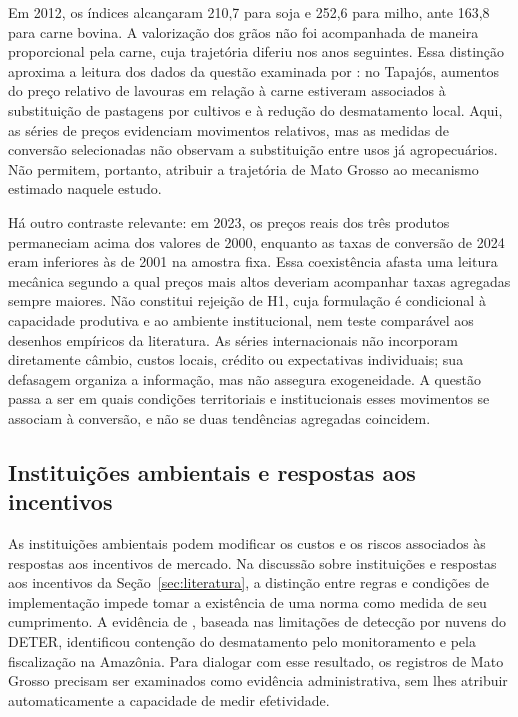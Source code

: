 Em 2012, os índices alcançaram 210,7 para soja e 252,6 para milho, ante 163,8 para carne bovina. A valorização dos grãos não foi acompanhada de maneira proporcional pela carne, cuja trajetória diferiu nos anos seguintes. Essa distinção aproxima a leitura dos dados da questão examinada por : no Tapajós, aumentos do preço relativo de lavouras em relação à carne estiveram associados à substituição de pastagens por cultivos e à redução do desmatamento local. Aqui, as séries de preços evidenciam movimentos relativos, mas as medidas de conversão selecionadas não observam a substituição entre usos já agropecuários. Não permitem, portanto, atribuir a trajetória de Mato Grosso ao mecanismo estimado naquele estudo.

Há outro contraste relevante: em 2023, os preços reais dos três produtos permaneciam acima dos valores de 2000, enquanto as taxas de conversão de 2024 eram inferiores às de 2001 na amostra fixa. Essa coexistência afasta uma leitura mecânica segundo a qual preços mais altos deveriam acompanhar taxas agregadas sempre maiores. Não constitui rejeição de H1, cuja formulação é condicional à capacidade produtiva e ao ambiente institucional, nem teste comparável aos desenhos empíricos da literatura. As séries internacionais não incorporam diretamente câmbio, custos locais, crédito ou expectativas individuais; sua defasagem organiza a informação, mas não assegura exogeneidade. A questão passa a ser em quais condições territoriais e institucionais esses movimentos se associam à conversão, e não se duas tendências agregadas coincidem.

\FloatBarrier
\subsection{Instituições ambientais e respostas aos incentivos}
\label{subsec:mt-instituicoes}

As instituições ambientais podem modificar os custos e os riscos associados às respostas aos incentivos de mercado. Na discussão sobre instituições e respostas aos incentivos da Seção~\ref{sec:literatura}, a distinção entre regras e condições de implementação impede tomar a existência de uma norma como medida de seu cumprimento. A evidência de , baseada nas limitações de detecção por nuvens do DETER, identificou contenção do desmatamento pelo monitoramento e pela fiscalização na Amazônia. Para dialogar com esse resultado, os registros de Mato Grosso precisam ser examinados como evidência administrativa, sem lhes atribuir automaticamente a capacidade de medir efetividade.

